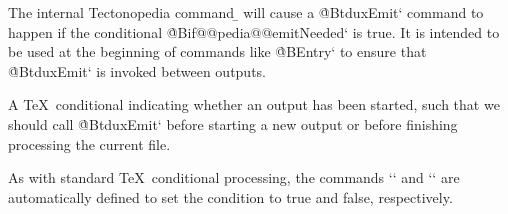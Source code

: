 
The internal Tectonopedia command \b{\string\pedia@maybeEmit} will cause a
\`@BtduxEmit` command to happen if the conditional \`@Bif@@pedia@@emitNeeded` is
true. It is intended to be used at the beginning of commands like \`@BEntry` to
ensure that \`@BtduxEmit` is invoked between outputs.



A \TeX\ conditional indicating whether an output has been started, such that we
should call \`@BtduxEmit` before starting a new output or before finishing
processing the current file.

As with standard \TeX\ conditional processing, the commands
\tex`\@pedia@emitNeededtrue` and \tex`\@pedia@emitNeededfalse` are
automatically defined to set the condition to true and false, respectively.

